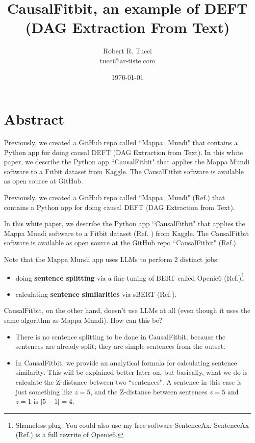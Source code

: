 \documentclass[12pt]{article}
\begin{document}
\title{CausalFitbit, an example of DEFT (DAG Extraction From Text)}
\date{ \today}
\author{Robert R. Tucci\\
        tucci@ar-tiste.com}
\maketitle
\vskip2cm
\section*{Abstract}
Previously,
we created a GitHub repo called  ``Mappa\_Mundi"  that contains a Python app for
doing causal DEFT (DAG Extraction from Text).
In this white paper, we
describe the Python app ``CausalFitbit"
that applies the  Mappa Mundi software  to 
a Fitbit dataset from Kaggle.
The CausalFitbit software 
is available as open source at  GitHub.

\newpage

Previously,
we created a GitHub repo called  ``Mappa\_Mundi" (Ref.\cite{github-mappa-mundi}) that contains a Python app for
doing causal DEFT (DAG Extraction from Text).

In this white paper, we
describe the Python app ``CausalFitbit"
that applies the  Mappa Mundi software  to 
a Fitbit dataset (Ref. \cite{fitbit-dataset}) from Kaggle.
The CausalFitbit software 
is available as open source at the GitHub repo
``CausalFitbit" (Ref.\cite{causal-fitbit}).

Note that the Mappa Mundi app uses LLMs 
to perform 2 distinct jobs: 
\begin{itemize}
\item doing {\bf sentence splitting} via a fine tuning of BERT called Openie6 (Ref.\cite{openie6})\footnote{Shameless
plug: You could also use my free software SentenceAx. SentenceAx (Ref.\cite{sentence-ax}) is a full rewrite of Openie6.}

\item calculating {\bf sentence similarities} via sBERT (Ref.\cite{sbert}).
\end{itemize}

CausalFitbit, on the other hand,
doesn't use LLMs at all (even though it uses the same algorithm as Mappa Mundi). How can this be? 

\begin{itemize}
\item
There is no sentence splitting to be done in CausalFitbit, because the sentences are already split; they are simple sentences from the outset.  
\item In CausalFitbit, we provide an analytical
formula for calculating sentence similarity. This will be explained better later on,
but basically, what we do is 
calculate the Z-distance between two ``sentences". A sentence in this case
is just something like $z=5$,
and the Z-distance between sentences
$z=5$ and $z=1$ is $|5-1|=4$.
\end{itemize} 
\end{document}
